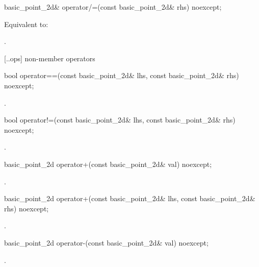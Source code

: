 %
\begin{itemdecl}
basic_point_2d& operator/=(const basic_point_2d& rhs) noexcept;
\end{itemdecl}
\begin{itemdescr}
\pnum
\effects
Equivalent to: 

\pnum
\returns
{}.
\end{itemdescr}

 [\iotwod.\pointtwod.ops] { non-member operators}

%
\begin{itemdecl}
bool operator==(const basic_point_2d& lhs, const basic_point_2d& rhs) noexcept;
\end{itemdecl}
\begin{itemdescr}
\pnum
\returns
{}.
\end{itemdescr}

%
\begin{itemdecl}
bool operator!=(const basic_point_2d& lhs, const basic_point_2d& rhs) noexcept;
\end{itemdecl}
\begin{itemdescr}
\pnum
\returns
{}.
\end{itemdescr}

%
\begin{itemdecl}
basic_point_2d operator+(const basic_point_2d& val) noexcept;
\end{itemdecl}
\begin{itemdescr}
\pnum
\returns
{}.
\end{itemdescr}

%
\begin{itemdecl}
basic_point_2d operator+(const basic_point_2d& lhs, const basic_point_2d& rhs) noexcept;
\end{itemdecl}
\begin{itemdescr}
\pnum
\returns
{}.
\end{itemdescr}

%
\begin{itemdecl}
basic_point_2d operator-(const basic_point_2d& val) noexcept;
\end{itemdecl}
\begin{itemdescr}
\pnum
\returns
{}.
\end{itemdescr}

